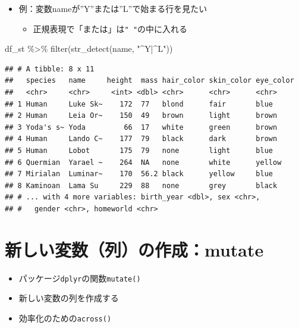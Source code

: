 \documentclass[
  xelatex,ja=standard, b5paper]{bxjsbook}
\newenvironment{Shaded}{\begin{snugshade}}{\end{snugshade}}
\newcommand{\FunctionTok}[1]{\textcolor[rgb]{0.00,0.00,0.00}{#1}}
\newcommand{\NormalTok}[1]{#1}
\newcommand{\SpecialCharTok}[1]{\textcolor[rgb]{0.00,0.00,0.00}{#1}}
\newcommand{\StringTok}[1]{\textcolor[rgb]{0.31,0.60,0.02}{#1}}
\providecommand{\tightlist}{%
  \setlength{\itemsep}{0pt}\setlength{\parskip}{0pt}}
\begin{document}
\begin{itemize}
\tightlist
\item
  例：変数nameが''Y''または''L''で始まる行を見たい

  \begin{itemize}
  \tightlist
  \item
    正規表現で「または」は\texttt{"\ "}の中に入れる
  \end{itemize}
\end{itemize}

\begin{Shaded}
\begin{Highlighting}[]
\NormalTok{df\_st }\SpecialCharTok{\%\textgreater{}\%}
  \FunctionTok{filter}\NormalTok{(}\FunctionTok{str\_detect}\NormalTok{(name, }\StringTok{"\^{}Y|\^{}L"}\NormalTok{))}
\end{Highlighting}
\end{Shaded}

\begin{verbatim}
## # A tibble: 8 x 11
##   species   name     height  mass hair_color skin_color eye_color
##   <chr>     <chr>     <int> <dbl> <chr>      <chr>      <chr>    
## 1 Human     Luke Sk~    172  77   blond      fair       blue     
## 2 Human     Leia Or~    150  49   brown      light      brown    
## 3 Yoda's s~ Yoda         66  17   white      green      brown    
## 4 Human     Lando C~    177  79   black      dark       brown    
## 5 Human     Lobot       175  79   none       light      blue     
## 6 Quermian  Yarael ~    264  NA   none       white      yellow   
## 7 Mirialan  Luminar~    170  56.2 black      yellow     blue     
## 8 Kaminoan  Lama Su     229  88   none       grey       black    
## # ... with 4 more variables: birth_year <dbl>, sex <chr>,
## #   gender <chr>, homeworld <chr>
\end{verbatim}

\hypertarget{mutate}{%
\chapter{新しい変数（列）の作成：mutate}\label{mutate}}

\begin{itemize}
\tightlist
\item
  パッケージ\texttt{dplyr}の関数\texttt{mutate()}
\item
  新しい変数の列を作成する
\item
  効率化のための\texttt{across()}
\end{itemize}
\end{document}
